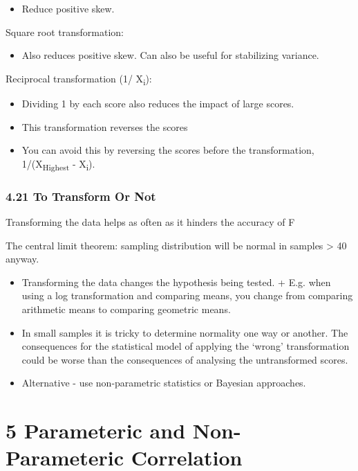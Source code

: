 \documentclass[]{article}
\providecommand{\tightlist}{%
  \setlength{\itemsep}{0pt}\setlength{\parskip}{0pt}}
\begin{document}
\begin{itemize}
\tightlist
\item
  Reduce positive skew.
\end{itemize}

Square root transformation:

\begin{itemize}
\tightlist
\item
  Also reduces positive skew. Can also be useful for stabilizing
  variance.
\end{itemize}

Reciprocal transformation (1/ X\textsubscript{i}):

\begin{itemize}
\tightlist
\item
  Dividing 1 by each score also reduces the impact of large scores.
\item
  This transformation reverses the scores
\item
  You can avoid this by reversing the scores before the transformation,
  1/(X\textsubscript{Highest} - X\textsubscript{i}).
\end{itemize}

\hypertarget{to-transform-or-not}{%
\subsubsection{4.21 To Transform Or Not}\label{to-transform-or-not}}

Transforming the data helps as often as it hinders the accuracy of F

The central limit theorem: sampling distribution will be normal in
samples \textgreater{} 40 anyway.

\begin{itemize}
\item
  Transforming the data changes the hypothesis being tested. + E.g. when
  using a log transformation and comparing means, you change from
  comparing arithmetic means to comparing geometric means.
\item
  In small samples it is tricky to determine normality one way or
  another. The consequences for the statistical model of applying the
  `wrong' transformation could be worse than the consequences of
  analysing the untransformed scores.
\item
  Alternative - use non-parametric statistics or Bayesian approaches.
\end{itemize}

\hypertarget{parameteric-and-non-parameteric-correlation}{%
\section{5 Parameteric and Non-Parameteric
Correlation}\label{parameteric-and-non-parameteric-correlation}}
\end{document}
